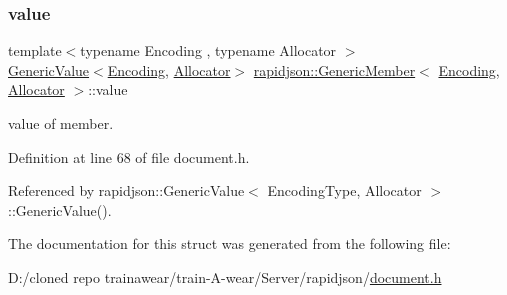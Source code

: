 \subsubsection{\texorpdfstring{value}{value}}
{\footnotesize\ttfamily template$<$typename Encoding , typename Allocator $>$ \\
\mbox{\hyperlink{classrapidjson_1_1_generic_value}{Generic\+Value}}$<$\mbox{\hyperlink{classrapidjson_1_1_encoding}{Encoding}}, \mbox{\hyperlink{classrapidjson_1_1_allocator}{Allocator}}$>$ \mbox{\hyperlink{structrapidjson_1_1_generic_member}{rapidjson\+::\+Generic\+Member}}$<$ \mbox{\hyperlink{classrapidjson_1_1_encoding}{Encoding}}, \mbox{\hyperlink{classrapidjson_1_1_allocator}{Allocator}} $>$\+::value}



value of member. 



Definition at line 68 of file document.\+h.



Referenced by rapidjson\+::\+Generic\+Value$<$ Encoding\+Type, Allocator $>$\+::\+Generic\+Value().



The documentation for this struct was generated from the following file\+:\begin{DoxyCompactItemize}
\item 
D\+:/cloned repo trainawear/train-\/\+A-\/wear/\+Server/rapidjson/\mbox{\hyperlink{document_8h}{document.\+h}}\end{DoxyCompactItemize}

